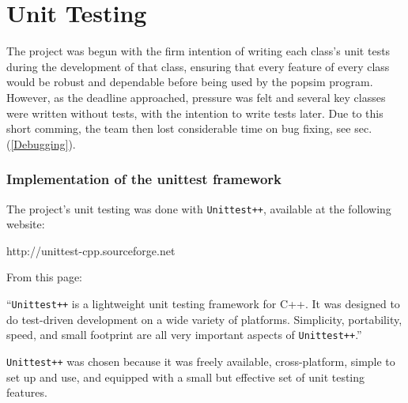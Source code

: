 \section{Unit Testing}
\label{Testing}
The project was begun with the firm intention of writing each class's unit tests during the development of that class, ensuring that every feature of every class would be robust and dependable before being used by the popsim program.  However, as the deadline approached, pressure was felt and several key classes were written without tests, with the intention to write tests later.
Due to this short comming, the team then lost considerable time on bug fixing, see sec.(\ref{Debugging}).

\subsubsection{Implementation of the unittest framework}
The project's unit testing was done with \texttt{Unittest++}, available at the following website:
\begin{center}
 http://unittest-cpp.sourceforge.net
\end{center}
From this page:
\begin{center}
``\texttt{Unittest++} is a lightweight unit testing framework for C++.  It was designed to do test-driven development on a wide variety of platforms. Simplicity, portability, speed, and small footprint are all very important aspects of \texttt{Unittest++}.''
\end{center}
\texttt{Unittest++} was chosen because it was freely available, cross-platform, simple to set up and use, and equipped with a small but effective set of unit testing features. 

